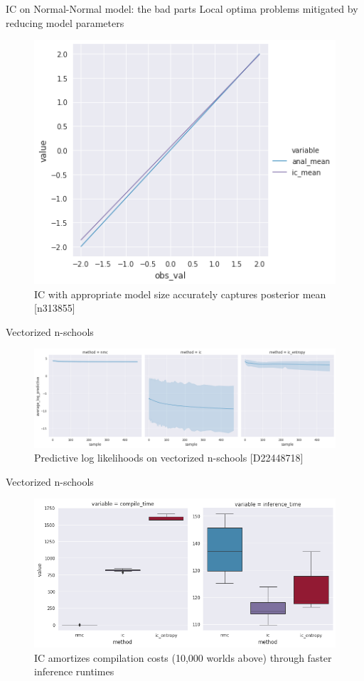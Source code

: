 \documentclass{beamer}
\begin{document}
\begin{frame}[fragile]{IC on Normal-Normal model: the bad parts}
    Local optima problems mitigated by reducing model parameters
    \begin{figure}
        \centering
        \includegraphics[width=0.6\linewidth]{figures/ic_normal_normal_linear.png}
        \caption{IC with appropriate model size accurately captures posterior mean [n313855]}
    \end{figure}
\end{frame}


\begin{frame}[fragile]{Vectorized n-schools}
	\begin{figure}
	    \centering
	    \includegraphics[width=0.9\linewidth]{figures/nschools-pll.png}
	    \caption{Predictive log likelihoods on vectorized n-schools [D22448718]}
	\end{figure}
\end{frame}

\begin{frame}[fragile]{Vectorized n-schools}
	\begin{figure}
	    \centering
	    \includegraphics[width=0.7\linewidth]{figures/nschools-compile-infer-time.png}
	    \caption{IC amortizes compilation costs (10,000 worlds above) through faster inference runtimes}
	\end{figure}
\end{frame}
\end{document}

